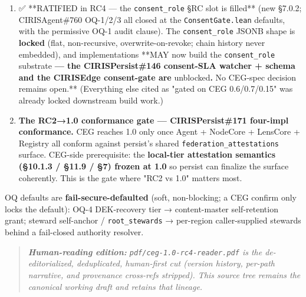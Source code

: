 \documentclass[11pt]{article}
\begin{document}
\begin{enumerate}\setlength\itemsep{0pt}
\item ✅ **RATIFIED in RC4 — the \texttt{consent\_role} §RC slot is filled** (new §7.0.2; CIRISAgent\#760 OQ-1/2/3 all closed at the \texttt{ConsentGate.lean} defaults, with the permissive OQ-1 audit clause). The \texttt{consent\_role} JSONB shape is \textbf{locked} (flat, non-recursive, overwrite-on-revoke; chain history never embedded), and implementations **MAY now build the \texttt{consent\_role} substrate\textbf{ — the CIRISPersist\#146 consent-SLA watcher + schema and the CIRISEdge consent-gate are }unblocked\textbf{. }No CEG-spec decision remains open.** (Everything else cited as "gated on CEG 0.6/0.7/0.15" was already locked downstream build work.)
\item \textbf{The RC2→1.0 conformance gate — CIRISPersist\#171 four-impl conformance.} CEG reaches 1.0 only once Agent + NodeCore + LensCore + Registry all conform against persist's shared \texttt{federation\_attestations} surface. CEG-side prerequisite: the \textbf{local-tier attestation semantics (§10.1.3 / §11.9 / §7) frozen at 1.0} so persist can finalize the surface coherently. This is the gate where "RC2 vs 1.0" matters most.
\end{enumerate}


OQ defaults are \textbf{fail-secure-defaulted} (soft, non-blocking; a CEG confirm only locks the default): OQ-4 DEK-recovery tier → content-master self-retention grant; steward self-anchor / \texttt{root\_stewards} → per-region caller-supplied stewards behind a fail-closed authority resolver.


\begin{quote}\itshape \textbf{Human-reading edition:} \texttt{pdf/ceg-1.0-rc4-reader.pdf} is the de-editorialized, deduplicated, human-first cut (version history, per-path narrative, and provenance cross-refs stripped). This source tree remains the canonical working draft and retains that lineage.\end{quote}
\end{document}

